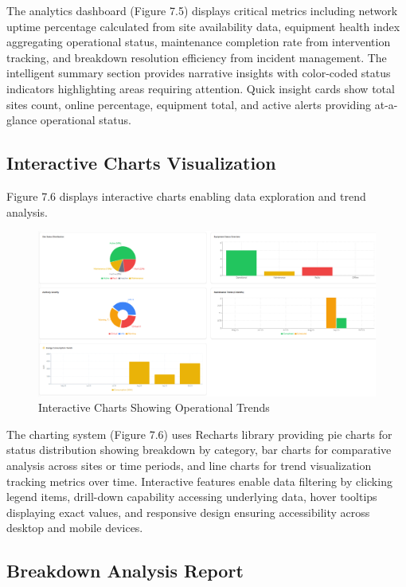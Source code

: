 The analytics dashboard (Figure 7.5) displays critical metrics including network uptime percentage calculated from site availability data, equipment health index aggregating operational status, maintenance completion rate from intervention tracking, and breakdown resolution efficiency from incident management. The intelligent summary section provides narrative insights with color-coded status indicators highlighting areas requiring attention. Quick insight cards show total sites count, online percentage, equipment total, and active alerts providing at-a-glance operational status.

\subsection{Interactive Charts Visualization}

Figure 7.6 displays interactive charts enabling data exploration and trend analysis.

\begin{figure}[H]
    \centering
    \includegraphics[width=0.9\linewidth]{img/chap_07/screenshot_charts_visualization.png}
    \caption{Interactive Charts Showing Operational Trends}
    \label{fig:charts_visualization}
\end{figure}

The charting system (Figure 7.6) uses Recharts library providing pie charts for status distribution showing breakdown by category, bar charts for comparative analysis across sites or time periods, and line charts for trend visualization tracking metrics over time. Interactive features enable data filtering by clicking legend items, drill-down capability accessing underlying data, hover tooltips displaying exact values, and responsive design ensuring accessibility across desktop and mobile devices.

\subsection{Breakdown Analysis Report}

